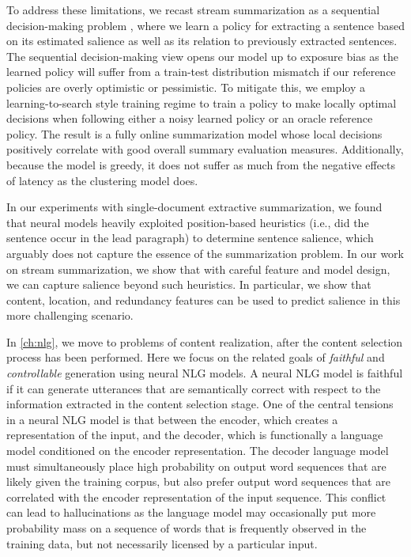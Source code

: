 To address these limitations, we recast stream summarization as a sequential
decision-making problem \citep{littman1996}, where we learn a policy for
extracting a sentence based on its estimated salience as well as its relation
to previously extracted sentences.  The sequential decision-making view opens
our model up to exposure bias as the learned policy will suffer from a
train-test distribution mismatch if our reference policies are overly
optimistic or pessimistic.  To mitigate this, we employ a learning-to-search
style training regime \citep{chang2015} to train a policy to make locally
optimal decisions when following either a noisy learned policy or an oracle
reference policy.  The result is a fully online summarization model whose
local decisions positively correlate with good overall summary evaluation
measures.  Additionally, because the model is greedy, it does not suffer as
much from the negative effects of latency as the clustering model does.
      
In our experiments with single-document extractive summarization, we found
that neural models heavily exploited position-based heuristics (i.e., did the
sentence occur in the lead paragraph) to determine sentence salience, which
arguably does not capture the essence of the summarization problem. In our
work on stream summarization, we show that with careful feature and model
design, we can capture salience beyond such heuristics.  In particular, we
show that content, location, and redundancy features can be used to predict
salience in this more challenging scenario.

In \autoref{ch:nlg}, we move to problems of content realization, after the
content selection process has been performed.  Here we focus on the related
goals of \textit{faithful} and \textit{controllable} generation using neural
NLG models. A neural NLG model is faithful if it can generate utterances that
are semantically correct with respect to the information extracted in the
content selection stage.  One of the central tensions in a neural NLG model is
that between the encoder, which creates a representation of the input, and the
decoder, which is functionally a language model conditioned on the encoder
representation.  The decoder language model must simultaneously place high
probability on output word sequences that are likely given the training
corpus, but also prefer output word sequences that are correlated with the
encoder representation of the input sequence. This conflict can lead to
hallucinations as the language model may occasionally put more probability
mass on a sequence of words that is frequently observed in the training data,
but not necessarily licensed by a particular input.

